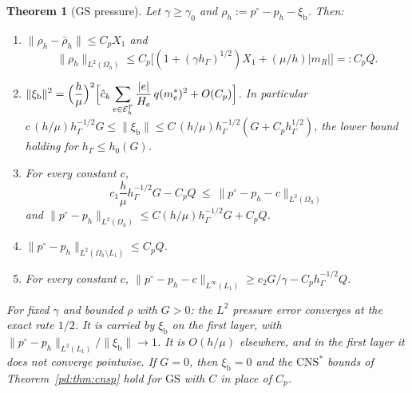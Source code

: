 \documentclass[11pt,reqno]{amsart}
\theoremstyle{plain}
\newtheorem{theorem}{Theorem}[section]
\theoremstyle{definition}
\newcommand{\hG}{h_\Gamma}
\newcommand{\Oh}{\Omega_h}
\newcommand{\EG}{\mathcal E_h^\Gamma}
\newcommand{\norm}[1]{\lVert #1\rVert}
\newcommand{\GS}{\mathrm{GS}}
\newcommand{\CNS}{\mathrm{CNS}^\ast}
\newcommand{\Lay}{L_1}
\newcommand{\xib}{\xi_{\mathrm b}}
\newcommand{\chat}{\hat c_k}
\begin{document}
\begin{theorem}[$\GS$ pressure]\label{pd:thm:gsp}
Let $\gamma\ge\gamma_0$ and $\rho_h:=p^\circ-p_h-\xib$. Then:
\begin{enumerate}[label=(\alph*)]
\item $\norm{\rho_h-\bar\rho_h}\le C_pX_1$ and
\[
\norm{\rho_h}_{L^2(\Oh)}\le C_p\bigl[(1+(\gamma\hG)^{1/2})X_1+(\mu/h)|m_R|\bigr]=:C_pQ .
\]
\item $\displaystyle\norm{\xib}^2=\Bigl(\frac h\mu\Bigr)^2\Bigl[\chat\sum_{e\in\EG}\frac{|e|}{H_e}\,q(m_e^\ast)^2+O(C_p)\Bigr]$. In particular $c\,(h/\mu)\hG^{-1/2}G\le\norm\xib\le C\,(h/\mu)\hG^{-1/2}(G+C_p\hG^{1/2})$, the lower bound holding for $\hG\le h_0(G)$.
\item For every constant $c$,
\[
c_1\frac h\mu\hG^{-1/2}G-C_pQ\ \le\ \norm{p^\circ-p_h-c}_{L^2(\Oh)}
\]
and $\norm{p^\circ-p_h}_{L^2(\Oh)}\le C(h/\mu)\hG^{-1/2}G+C_pQ$.
\item $\norm{p^\circ-p_h}_{L^2(\Oh\setminus\Lay)}\le C_pQ$.
\item For every constant $c$, $\norm{p^\circ-p_h-c}_{L^\infty(\Lay)}\ge c_2G/\gamma-C_p\hG^{-1/2}Q$.
\end{enumerate}
For fixed $\gamma$ and bounded $\rho$ with $G>0$: the $L^2$ pressure error converges at the exact rate $1/2$. It is carried by $\xib$ on the first layer, with $\norm{p^\circ-p_h}_{L^2(\Lay)}/\norm\xib\to1$. It is $O(h/\mu)$ elsewhere, and in the first layer it does not converge pointwise. If $G=0$, then $\xib=0$ and the $\CNS$ bounds of Theorem~\ref{pd:thm:cnsp} hold for $\GS$ with $C$ in place of $C_p$.
\end{theorem}
\end{document}
